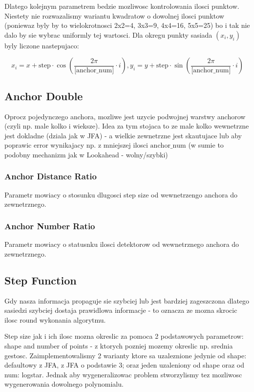 \documentclass[format=acmsmall,screen,review,authordraft,nonacm]{acmart}
\begin{document}
Dlatego kolejnym parametrem bedzie mozliwosc kontrolowania ilosci punktow.
Niestety nie rozwazalismy wariantu kwadratow o dowolnej ilosci punktow (poniewaz
byly by to wielokrotnosci 2x2=4, 3x3=9, 4x4=16, 5x5=25) bo i tak nie dalo by sie
wybrac uniformly tej wartosci. Dla okregu punkty sasiada $(x_i, y_i)$ byly liczone
nastepujaco:
   
$$
x_i = x + \text{step} \cdot \cos( \frac{2\pi}{\text{[anchor\_num]}} \cdot i ),
y_i = y + \text{step} \cdot \sin( \frac{2\pi}{\text{[anchor\_num]}} \cdot i )
$$

\subsection{Anchor Double} %

Oprocz pojedynczego anchora, mozliwe jest uzycie podwojnej warstwy anchorow
(czyli np. male kolko i wieksze). Idea za tym stojaca to ze male kolko
wewnetrzne jest dokladne (dziala jak w JFA) - a wielkie zewnetrzne
jest skautujace lub aby poprawic error wynikajacy np. z mniejszej ilosci
$\text{anchor\_num}$ (w sumie to podobny mechanizm jak w Lookahead - wolny/szybki)

\subsubsection{Anchor Distance Ratio}

Parametr mowiacy o stosunku dlugosci step size od wewnetrzengo anchora do
zewnetrznego.

\subsubsection{Anchor Number Ratio}

Parametr mowiacy o statusnku ilosci detektorow od wewnetrznego anchora do
zewnetrznego.

\subsection{Step Function} %

Gdy nasza informacja propaguje sie szybciej lub jest bardziej zageszczona
dlatego sasiedzi szybciej dostaja prawidlowa informacje - to oznacza ze mozna
skrocic ilosc round wykonania algorytmu.

Step size jak i ich ilosc mozna okreslic za pomoca 2 podstawowych parametrow:
shape and number of points - z ktorych pozniej mozemy okreslic np. srednia
gestosc. Zaimplementowalismy 2 warianty ktore sa uzaleznione jedynie od shape:
defaultowy z JFA, z JFA o podstawie 3; oraz jeden uzaleniony od shape oraz od num: logstar.
Jednak aby wygeneralizowac problem stworzylismy tez mozliwosc wygenerowania
dowolnego polynomialu.
\end{document}
